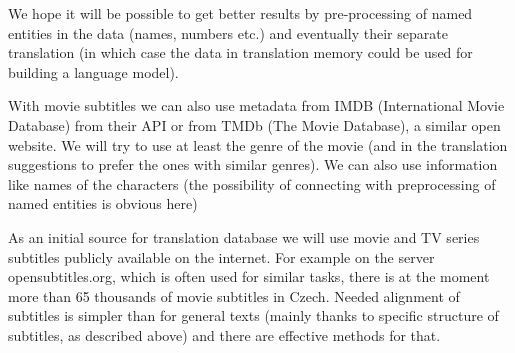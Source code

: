 We hope it will be possible to get better results by pre-processing of named entities in the data (names, numbers etc.) and eventually their separate translation (in which case the data in translation memory could be used for building a language model).

With movie subtitles we can also use metadata from IMDB (International Movie Database) from their API or from TMDb (The Movie Database), a similar open website. We will try to use at least the genre of the movie (and in the translation suggestions to prefer the ones with similar genres). We can also use information like names of the characters (the possibility of connecting with preprocessing of named entities is obvious here)


As an initial source for translation database we will use movie and TV series subtitles publicly available on the internet. For example on the server opensubtitles.org, which is often used for similar tasks, there is at the moment more than 65 thousands of movie subtitles in Czech. Needed alignment of subtitles is simpler than for general texts (mainly thanks to specific structure of subtitles, as described above) and there are effective methods for that.

